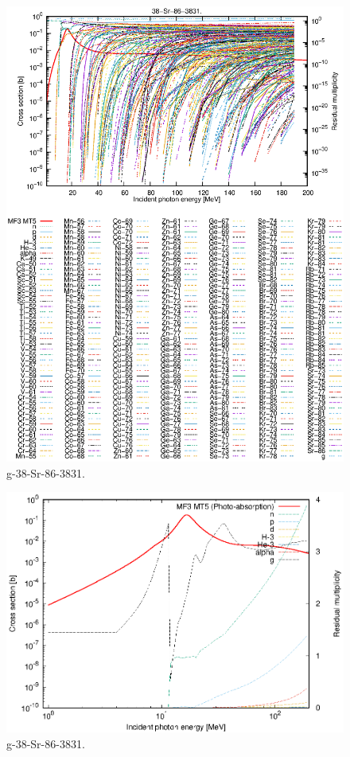 \begin{figure}
 \includegraphics[width=\linewidth]{eps/g_38-Sr-86_3831.eps}
  \caption{g-38-Sr-86-3831.}
\end{figure}
\newpage \clearpage

\begin{figure}
 \includegraphics[width=\linewidth]{eps-log/g_38-Sr-86_3831.eps}
 \caption{g-38-Sr-86-3831.}
\end{figure}
\newpage \clearpage

